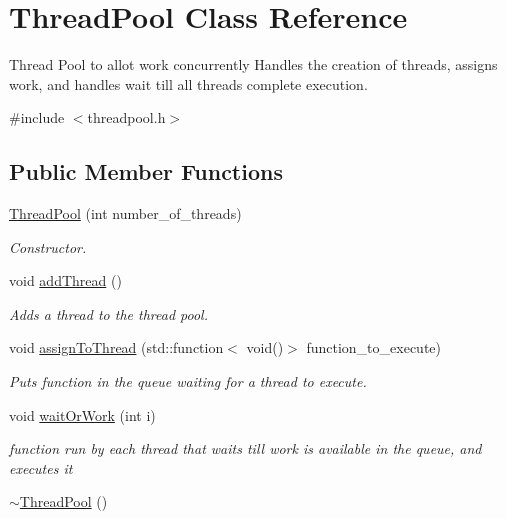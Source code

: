 \hypertarget{classThreadPool}{\section{Thread\-Pool Class Reference}
\label{classThreadPool}
}


Thread Pool to allot work concurrently Handles the creation of threads, assigns work, and handles wait till all threads complete execution.  




{\ttfamily \#include $<$threadpool.\-h$>$}

\subsection*{Public Member Functions}
\begin{DoxyCompactItemize}
\item 
\hyperlink{classThreadPool_a53fb4db20e08699bb52c2c332f611cc9}{Thread\-Pool} (int number\-\_\-of\-\_\-threads)
\begin{DoxyCompactList}\small\item\em Constructor. \end{DoxyCompactList}\item 
\hypertarget{classThreadPool_a7290a593e893111e2db6a6e226c471cb}{void \hyperlink{classThreadPool_a7290a593e893111e2db6a6e226c471cb}{add\-Thread} ()}\label{classThreadPool_a7290a593e893111e2db6a6e226c471cb}

\begin{DoxyCompactList}\small\item\em Adds a thread to the thread pool. \end{DoxyCompactList}\item 
void \hyperlink{classThreadPool_a07a236b214390a314589c1432d091d38}{assign\-To\-Thread} (std\-::function$<$ void()$>$ function\-\_\-to\-\_\-execute)
\begin{DoxyCompactList}\small\item\em Puts function in the queue waiting for a thread to execute. \end{DoxyCompactList}\item 
void \hyperlink{classThreadPool_a29dd5bbafbf80aeb33a1f60de36baed4}{wait\-Or\-Work} (int i)
\begin{DoxyCompactList}\small\item\em function run by each thread that waits till work is available in the queue, and executes it \end{DoxyCompactList}\item 
\hypertarget{classThreadPool_a44d3d2ab618970605e684efc216655eb}{\hyperlink{classThreadPool_a44d3d2ab618970605e684efc216655eb}{$\sim$\-Thread\-Pool} ()}\label{classThreadPool_a44d3d2ab618970605e684efc216655eb}


\end{DoxyCompactItemize}
